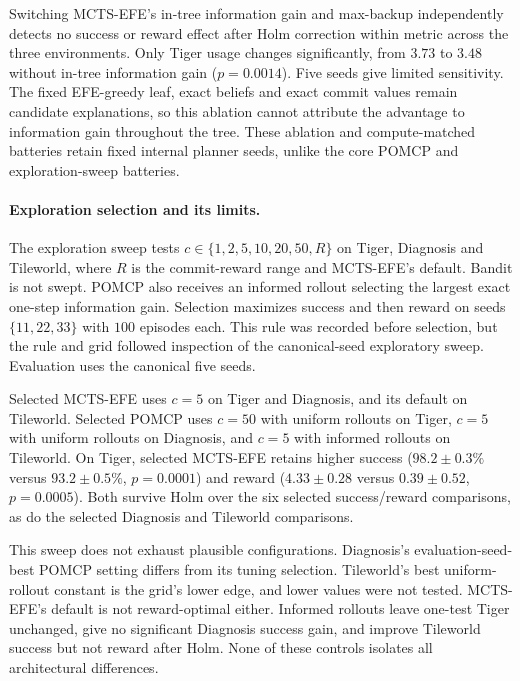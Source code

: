 Switching MCTS-EFE's in-tree information gain and max-backup independently detects no success or reward effect after Holm correction within metric across the three environments. Only Tiger usage changes significantly, from $3.73$ to $3.48$ without in-tree information gain ($p=0.0014$). Five seeds give limited sensitivity. The fixed EFE-greedy leaf, exact beliefs and exact commit values remain candidate explanations, so this ablation cannot attribute the advantage to information gain throughout the tree. These ablation and compute-matched batteries retain fixed internal planner seeds, unlike the core POMCP and exploration-sweep batteries.

\paragraph{Exploration selection and its limits.}
The exploration sweep tests $c\in\{1,2,5,10,20,50,R\}$ on Tiger, Diagnosis and Tileworld, where $R$ is the commit-reward range and MCTS-EFE's default. Bandit is not swept. POMCP also receives an informed rollout selecting the largest exact one-step information gain. Selection maximizes success and then reward on seeds $\{11,22,33\}$ with $100$ episodes each. This rule was recorded before selection, but the rule and grid followed inspection of the canonical-seed exploratory sweep. Evaluation uses the canonical five seeds.

Selected MCTS-EFE uses $c=5$ on Tiger and Diagnosis, and its default on Tileworld. Selected POMCP uses $c=50$ with uniform rollouts on Tiger, $c=5$ with uniform rollouts on Diagnosis, and $c=5$ with informed rollouts on Tileworld. On Tiger, selected MCTS-EFE retains higher success ($98.2\pm0.3\%$ versus $93.2\pm0.5\%$, $p=0.0001$) and reward ($4.33\pm0.28$ versus $0.39\pm0.52$, $p=0.0005$). Both survive Holm over the six selected success/reward comparisons, as do the selected Diagnosis and Tileworld comparisons.

This sweep does not exhaust plausible configurations. Diagnosis's evaluation-seed-best POMCP setting differs from its tuning selection. Tileworld's best uniform-rollout constant is the grid's lower edge, and lower values were not tested. MCTS-EFE's default is not reward-optimal either. Informed rollouts leave one-test Tiger unchanged, give no significant Diagnosis success gain, and improve Tileworld success but not reward after Holm. None of these controls isolates all architectural differences.

\FloatBarrier

